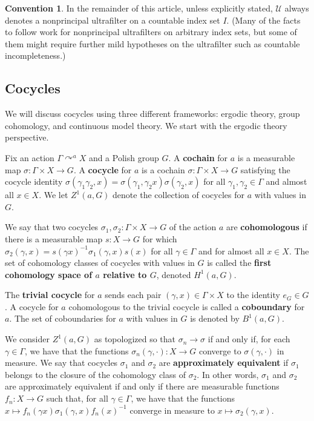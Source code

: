 \documentclass[12pt]{amsart}
\theoremstyle{definition}
\newtheorem{conv}[thm]{Convention}
\def\u{\mathsf 1}
\def \u{\mathcal U}
\newcommand{\acts}{\curvearrowright}
\begin{document}
\begin{conv}\label{ultraconvention}
    In the remainder of this article, unless explicitly stated, $\u$ always denotes a nonprincipal ultrafilter on a countable index set $I$.  (Many of the facts to follow work for nonprincipal ultrafilters on arbitrary index sets, but some of them might require further mild hypotheses on the ultrafilter such as countable incompleteness.)
\end{conv}

\subsection{Cocycles}

We will discuss cocycles using three different frameworks: ergodic theory,  group cohomology, and continuous model theory. We start with the ergodic theory perspective.

Fix an action $\Gamma\acts^a X$ and a Polish group $G$. A \textbf{cochain} for $a$ is a measurable map $\sigma : \Gamma \times X \rightarrow G$. A \textbf{cocycle} for $a$ is a cochain $\sigma:\Gamma\times X\to G$ satisfying the cocycle identity $\sigma(\gamma_1\gamma_2,x)=\sigma(\gamma_1,\gamma_2x)\sigma(\gamma_2,x)$ for all $\gamma_1,\gamma_2\in \Gamma$ and almost all $x\in X$. We let $Z^1(a,G)$ denote the collection of cocycles for $a$ with values in $G$.

We say that two cocycles $\sigma_1,\sigma_2:\Gamma\times X\to G$ of the action $a$ are \textbf{cohomologous} if there is a measurable map $s:X\to G$ for which $\sigma_2(\gamma,x)=s(\gamma x)^{-1}\sigma_1(\gamma,x)s(x)$ for all $\gamma\in \Gamma$ and for almost all $x\in X$. The set of cohomology classes of cocycles with values in $G$ is called the \textbf{first cohomology space of $a$ relative to $G$}, denoted $H^1(a,G)$.

The \textbf{trivial cocycle} for $a$ sends each pair $(\gamma,x)\in\Gamma\times X$ to the identity $e_G \in G$.  A cocycle for $a$ cohomologous to the trivial cocycle is called a \textbf{coboundary} for $a$.  The set of coboundaries for $a$ with values in $G$ is denoted by $B^1(a,G)$.

We consider $Z^1(a,G)$ as topologized so that $\sigma_n\to \sigma$ if and only if, for each $\gamma\in \Gamma$, we have that the functions $\sigma_n(\gamma, \cdot) : X \to G$ converge to $\sigma(\gamma, \cdot)$ in measure. We say that cocycles $\sigma_1$ and $\sigma_2$ are \textbf{approximately equivalent} if $\sigma_1$ belongs to the closure of the cohomology class of $\sigma_2$.  In other words, $\sigma_1$ and $\sigma_2$ are approximately equivalent if and only if there are measurable functions $f_n:X\to G$ such that, for all $\gamma\in \Gamma$, we have that the functions $x \mapsto f_n(\gamma x)\sigma_1(\gamma,x)f_n(x)^{-1}$ converge in measure to $x \mapsto \sigma_2(\gamma,x)$.
\end{document}
